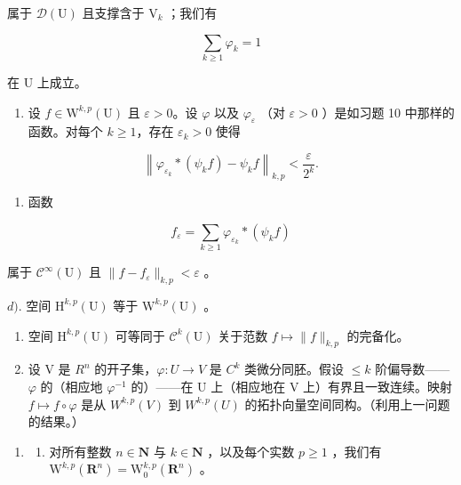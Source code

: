属于 \(\mathcal{D}(\mathrm{U})\) 且支撑含于 \(\mathrm{V}_k\) ；我们有

\[
\sum_ {k \geqslant 1} \varphi_ {k} = 1
\]

在 U 上成立。

\begin{enumerate}
\def\labelenumi{\alph{enumi})}
\setcounter{enumi}{1}
\tightlist
\item
  设 \(f \in \mathrm{W}^{k,p}(\mathrm{U})\) 且 \(\varepsilon > 0\)。设 \(\varphi\) 以及 \(\varphi_{\varepsilon}\) （对 \(\varepsilon > 0\) ）是如习题 10 中那样的函数。对每个 \(k \geqslant 1\)，存在 \(\varepsilon_{k} > 0\) 使得
\end{enumerate}

\[
\left\| \varphi_ {\varepsilon_ {k}} * (\psi_ {k} f) - \psi_ {k} f \right\| _ {k, p} <   \frac {\varepsilon}{2 ^ {k}}.
\]

\begin{enumerate}
\def\labelenumi{\alph{enumi})}
\setcounter{enumi}{2}
\tightlist
\item
  函数
\end{enumerate}

\[
f _ {\varepsilon} = \sum_ {k \geqslant 1} \varphi_ {\varepsilon_ {k}} * (\psi_ {k} f)
\]

属于 \(\mathcal{C}^{\infty}(\mathrm{U})\) 且 \(\| f - f_{\varepsilon}\|_{k,p} < \varepsilon\) 。

\(d)\). 空间 \(\mathrm{H}^{k,p}(\mathrm{U})\) 等于 \(\mathrm{W}^{k,p}(\mathrm{U})\) 。

\begin{enumerate}
\def\labelenumi{\alph{enumi})}
\setcounter{enumi}{4}
\item
  空间 \(\mathrm{H}^{k,p}(\mathrm{U})\) 可等同于 \(\mathcal{C}^{k}(\mathrm{U})\) 关于范数 \(f \mapsto \|f\|_{k,p}\) 的完备化。
\item
  设 V 是 \(R^{n}\) 的开子集，\(\varphi\colon U\to V\) 是 \(C^{k}\) 类微分同胚。假设 \(\leqslant k\) 阶偏导数——\(\varphi\) 的（相应地 \(\varphi^{-1}\) 的）——在 U 上（相应地在 V 上）有界且一致连续。映射 \(f\mapsto f\circ\varphi\) 是从 \(W^{k,p}(V)\) 到 \(W^{k,p}(U)\) 的拓扑向量空间同构。（利用上一问题的结果。）
\end{enumerate}

\begin{enumerate}
\def\labelenumi{\arabic{enumi})}
\setcounter{enumi}{11}
\tightlist
\item
  \begin{enumerate}
  \def\labelenumii{\alph{enumii})}
  \tightlist
  \item
    对所有整数 \(n \in \mathbf{N}\) 与 \(k \in \mathbf{N}\) ，以及每个实数 \(p \geqslant 1\) ，我们有 \(\mathrm{W}^{k,p}(\mathbf{R}^n) = \mathrm{W}_0^{k,p}(\mathbf{R}^n)\) 。
  \end{enumerate}
\end{enumerate}

